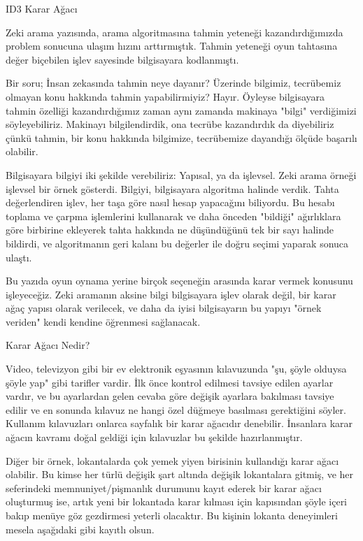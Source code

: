 \documentclass[12pt,fleqn]{article}\usepackage{../../common}
\begin{document}
ID3 Karar Ağacı

Zeki arama yazısında, arama algoritmasına tahmin yeteneği kazandırdığımızda
problem sonucuna ulaşım hızını arttırmıştık. Tahmin yeteneği oyun tahtasına
değer biçebilen işlev sayesinde bilgisayara kodlanmıştı.

Bir soru; İnsan zekasında tahmin neye dayanır? Üzerinde bilgimiz,
tecrübemiz olmayan konu hakkında tahmin yapabilirmiyiz? Hayır. Öyleyse
bilgisayara tahmin özelliği kazandırdığımız zaman aynı zamanda makinaya
"bilgi" verdiğimizi söyleyebiliriz. Makinayı bilgilendirdik, ona tecrübe
kazandırdık da diyebiliriz çünkü tahmin, bir konu hakkında bilgimize,
tecrübemize dayandığı ölçüde başarılı olabilir.

Bilgisayara bilgiyi iki şekilde verebiliriz: Yapısal, ya da işlevsel. Zeki
arama örneği işlevsel bir örnek gösterdi. Bilgiyi, bilgisayara algoritma
halinde verdik. Tahta değerlendiren işlev, her taşa göre nasıl hesap
yapacağını biliyordu. Bu hesabı toplama ve çarpma işlemlerini kullanarak ve
daha önceden "bildiği" ağırlıklara göre birbirine ekleyerek tahta hakkında
ne düşündüğünü tek bir sayı halinde bildirdi, ve algoritmanın geri kalanı
bu değerler ile doğru seçimi yaparak sonuca ulaştı.

Bu yazıda oyun oynama yerine birçok seçeneğin arasında karar vermek
konusunu işleyeceğiz. Zeki aramanın aksine bilgi bilgisayara işlev olarak
değil, bir karar ağaç yapısı olarak verilecek, ve daha da iyisi
bilgisayarın bu yapıyı "örnek veriden" kendi kendine öğrenmesi
sağlanacak.

Karar Ağacı Nedir?

Video, televizyon gibi bir ev elektronik eşyasının kılavuzunda "şu, şöyle
olduysa şöyle yap" gibi tarifler vardir. İlk önce kontrol edilmesi tavsiye
edilen ayarlar vardır, ve bu ayarlardan gelen cevaba göre değişik ayarlara
bakılması tavsiye edilir ve en sonunda kılavuz ne hangi özel düğmeye
basılması gerektiğini söyler. Kullanım kılavuzları onlarca sayfalık bir
karar ağacıdır denebilir. İnsanlara karar ağacın kavramı doğal geldiği için
kılavuzlar bu şekilde hazırlanmıştır.

Diğer bir örnek, lokantalarda çok yemek yiyen birisinin kullandığı karar
ağacı olabilir. Bu kimse her türlü değişik şart altında değişik lokantalara
gitmiş, ve her seferindeki memnuniyet/pişmanlık durumunu kayıt ederek bir
karar ağacı oluşturmuş ise, artık yeni bir lokantada karar kılması için
kapısından şöyle içeri bakıp menüye göz gezdirmesi yeterli olacaktır. Bu
kişinin lokanta deneyimleri mesela aşağıdaki gibi kayıtlı olsun.
\end{document}
